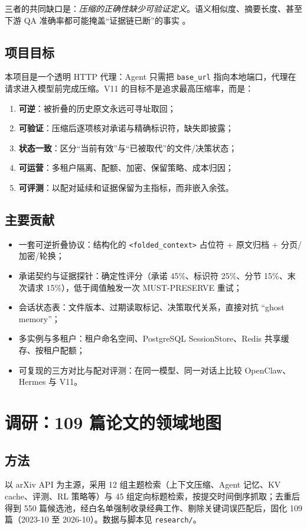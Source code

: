 \documentclass[11pt,a4paper]{ctexart}
\begin{document}
三者的共同缺口是：\emph{压缩的正确性缺少可验证定义}。语义相似度、摘要长度、甚至下游 QA 准确率都可能掩盖“证据链已断”的事实 \cite{keepbench,compactbench}。

\subsection{项目目标}
本项目是一个透明 HTTP 代理：Agent 只需把 \texttt{base\_url} 指向本地端口，代理在请求进入模型前完成压缩。V11 的目标不是追求最高压缩率，而是：
\begin{enumerate}
  \item \textbf{可逆}：被折叠的历史原文永远可寻址取回；
  \item \textbf{可验证}：压缩后逐项核对承诺与精确标识符，缺失即披露；
  \item \textbf{状态一致}：区分“当前有效”与“已被取代”的文件/决策状态；
  \item \textbf{可运营}：多租户隔离、配额、加密、保留策略、成本归因；
  \item \textbf{可评测}：以配对延续和证据保留为主指标，而非嵌入余弦。
\end{enumerate}

\subsection{主要贡献}
\begin{itemize}
  \item 一套可逆折叠协议：结构化的 \texttt{<folded\_context>} 占位符 + 原文归档 + 分页/加密/轮换；
  \item 承诺契约与证据探针：确定性评分（承诺 45\%、标识符 25\%、分节 15\%、末次请求 15\%），低于阈值触发一次 MUST-PRESERVE 重试；
  \item 会话状态表：文件版本、过期读取标记、决策取代关系，直接对抗 “ghost memory”；
  \item 多实例与多租户：租户命名空间、PostgreSQL SessionStore、Redis 共享缓存、按租户配额；
  \item 可复现的三方对比与配对评测：在同一模型、同一对话上比较 OpenClaw、Hermes 与 V11。
\end{itemize}

\section{调研：109 篇论文的领域地图}

\subsection{方法}
以 arXiv API 为主源，采用 12 组主题检索（上下文压缩、Agent 记忆、KV cache、评测、RL 策略等）与 45 组定向标题检索，按提交时间倒序抓取；去重后得到 550 篇候选池，经白名单强制收录经典工作、剔除关键词误匹配后，固化 109 篇（2023-10 至 2026-10）。数据与脚本见 \texttt{research/}。
\end{document}
